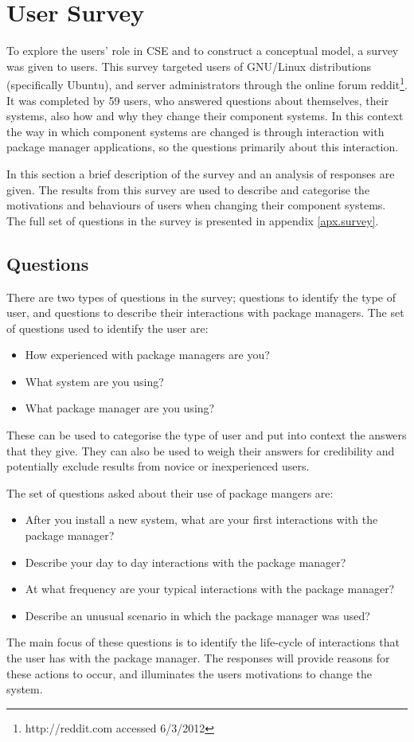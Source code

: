 \section{User Survey}
\label{strat.usersurvey}
To explore the users' role in CSE and to construct a conceptual model, a survey was given to users.
This survey targeted users of GNU/Linux distributions (specifically Ubuntu), and server administrators through the online forum reddit\footnote{http://reddit.com accessed 6/3/2012}.
It was completed by 59 users, who answered questions about themselves, their systems, also how and why they change their component systems.
In this context the way in which component systems are changed is through interaction with package manager applications, 
so the questions primarily about this interaction.

In this section a brief description of the survey and an analysis of responses are given.
The results from this survey are used to describe and categorise the motivations and behaviours of users when changing their component systems.
The full set of questions in the survey is presented in appendix \ref{apx.survey}. 

\subsection{Questions}
There are two types of questions in the survey; questions to identify the type of user, and questions to describe their interactions with package managers.
The set of questions used to identify the user are:
\begin{itemize}
  \item How experienced with package managers are you? 
  \item What system are you using?
  \item What package manager are you using?
\end{itemize}
These can be used to categorise the type of user and put into context the answers that they give.
They can also be used to weigh their answers for credibility and potentially exclude results from novice or inexperienced users. 

The set of questions asked about their use of package mangers are:
\begin{itemize}
  \item After you install a new system, what are your first interactions with the package manager?
  \item Describe your day to day interactions with the package manager?
  \item At what frequency are your typical interactions with the package manager?
  \item Describe an unusual scenario in which the package manager was used?
\end{itemize}
The main focus of these questions is to identify the life-cycle of interactions that the user has with the package manager.
The responses will provide reasons for these actions to occur, and illuminates the users motivations to change the system.

